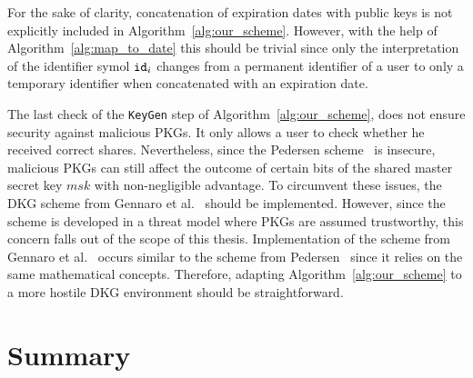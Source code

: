 For the sake of clarity, concatenation of expiration dates with public keys is not explicitly included in Algorithm~\ref{alg:our_scheme}. However, with the help of Algorithm~\ref{alg:map_to_date} this should be trivial since only the interpretation of the identifier symol $\mathtt{id}_{i}$ changes from a permanent identifier of a user to only a temporary identifier when concatenated with an expiration date.

The last check of the \texttt{KeyGen} step of Algorithm~\ref{alg:our_scheme}, does not ensure security against malicious PKGs. It only allows a user to check whether he received correct shares. Nevertheless, since the Pedersen scheme~\cite{art:Pedersen91a} is insecure, malicious PKGs can still affect the outcome of certain bits of the shared master secret key $msk$ with non-negligible advantage. To circumvent these issues, the DKG scheme from Gennaro et al.~\cite{art:GennaroJKR07} should be implemented. However, since the scheme is developed in a threat model where PKGs are assumed trustworthy, this concern falls out of the scope of this thesis. Implementation of the scheme from Gennaro et al.~\cite{art:GennaroJKR07} occurs similar to the scheme from Pedersen~\cite{art:Pedersen91a} since it relies on the same mathematical concepts. Therefore, adapting Algorithm~\ref{alg:our_scheme} to a more hostile DKG environment should be straightforward.

\section{Summary}


\newpage

\thispagestyle{empty}

\makeatletter
\setlength{\headsep}{-10pt}
\makeatother

